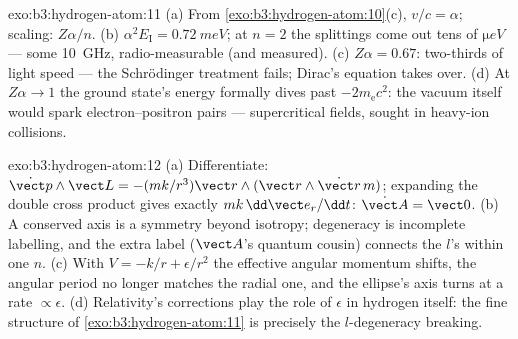 \begin{solution}{exo:b3:hydrogen-atom:11}
(a) From \cref{exo:b3:hydrogen-atom:10}(c), $v/c = \alpha$;
scaling: $Z\alpha/n$. (b) $\alpha^2E_{\text{I}} = \qty{0.72}{meV}$;
at $n = 2$ the splittings come out tens of $\unit{\micro eV}$ ---
some \qty{10}{GHz}, radio-measurable (and measured). (c) $Z\alpha =
0.67$: two-thirds of light speed --- the Schrödinger treatment
fails; Dirac's equation takes over. (d) At $Z\alpha \to 1$ the
ground state's energy formally dives past $-2m_{\text{e}}c^2$: the
vacuum itself would spark electron--positron pairs --- supercritical
fields, sought in heavy-ion collisions.
\end{solution}

\begin{solution}{exo:b3:hydrogen-atom:12}
(a) Differentiate: $\dot{\vect p}\wedge\vect L = -(mk/r^3)\vect
r\wedge(\vect r\wedge\dot{\vect r}\,m)$; expanding the double cross
product gives exactly $mk\,\dd\vect e_r/\dd t$: $\dot{\vect A} =
\vect 0$. (b) A conserved axis is a symmetry beyond isotropy;
degeneracy is incomplete labelling, and the extra label ($\vect
A$'s quantum cousin) connects the $l$'s within one $n$. (c) With
$V = -k/r + \epsilon/r^2$ the effective angular momentum shifts,
the angular period no longer matches the radial one, and the
ellipse's axis turns at a rate $\propto\epsilon$. (d) Relativity's
corrections play the role of $\epsilon$ in hydrogen itself: the
fine structure of \cref{exo:b3:hydrogen-atom:11} is precisely the
$l$-degeneracy breaking.
\end{solution}

